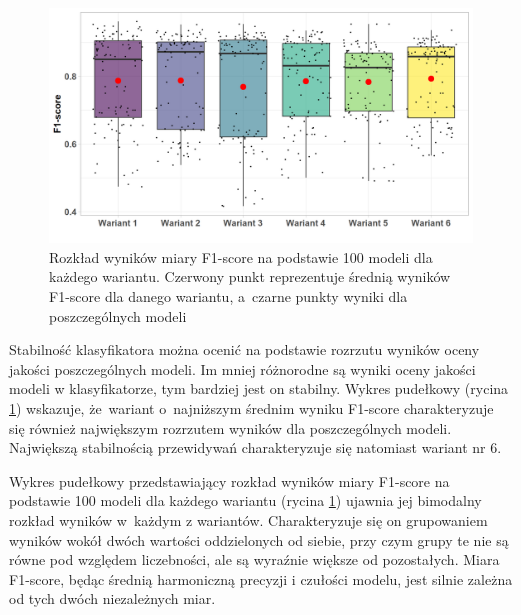 \documentclass{amuthesis}
\begin{document}
\begin{figure}[t]

{\centering \includegraphics[width=1\textwidth,height=\textheight]{figures/f1_score_boxplot.png}

}

\caption{\label{fig-rycina-f1-score-boxplot}Rozkład wyników miary
F1-score na podstawie 100 modeli dla każdego wariantu. Czerwony punkt
reprezentuje średnią wyników F1-score dla danego wariantu, a~czarne
punkty wyniki dla poszczególnych modeli}

\end{figure}

Stabilność klasyfikatora można ocenić na podstawie rozrzutu wyników
oceny jakości poszczególnych modeli. Im mniej różnorodne są wyniki oceny
jakości modeli w klasyfikatorze, tym bardziej jest on stabilny. Wykres
pudełkowy (rycina \ref{fig-rycina-f1-score-boxplot}) wskazuje,
że~wariant o~najniższym średnim wyniku F1-score charakteryzuje się
również największym rozrzutem wyników dla poszczególnych modeli.
Największą stabilnością przewidywań charakteryzuje się natomiast wariant
nr 6.

Wykres pudełkowy przedstawiający rozkład wyników miary F1-score na
podstawie 100 modeli dla każdego wariantu (rycina
\ref{fig-rycina-f1-score-boxplot}) ujawnia jej bimodalny rozkład wyników
w~każdym z wariantów. Charakteryzuje się on grupowaniem wyników wokół
dwóch wartości oddzielonych od siebie, przy czym grupy te nie są równe
pod względem liczebności, ale są wyraźnie większe od pozostałych. Miara
F1-score, będąc średnią harmoniczną precyzji i czułości modelu, jest
silnie zależna od tych dwóch niezależnych miar.
\end{document}
